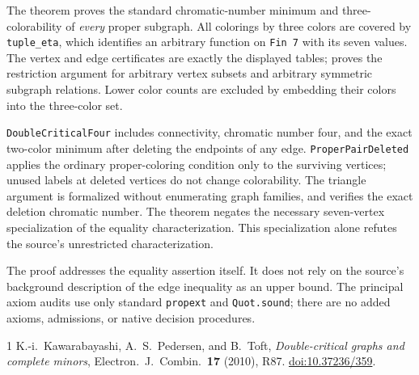 \documentclass[10pt]{article}
\begin{document}
The theorem  proves the standard chromatic-number
minimum and three-colorability of \emph{every} proper subgraph.
All colorings by three colors are covered by \texttt{tuple\_eta},
which identifies an arbitrary function on \texttt{Fin 7} with its seven
values. The vertex and edge certificates are exactly the displayed tables;
 proves the restriction argument for arbitrary
vertex subsets and arbitrary symmetric subgraph relations.
Lower color counts are excluded by embedding their colors into the three-color set.

\texttt{DoubleCriticalFour} includes connectivity, chromatic number four,
and the exact two-color minimum after deleting the endpoints of any edge.
\texttt{ProperPairDeleted} applies the ordinary proper-coloring condition
only to the surviving vertices; unused labels at deleted vertices do not
change colorability. The triangle argument is formalized without
enumerating graph families, and  verifies
the exact deletion chromatic number.
The theorem  negates the necessary
seven-vertex specialization of the equality characterization.
This specialization alone refutes the source's unrestricted characterization.

The proof addresses the equality assertion itself. It does not rely on the
source's background description of the edge inequality as an upper bound.
The principal axiom audits use only standard \texttt{propext} and
\texttt{Quot.sound}; there are no added axioms, admissions, or native
decision procedures.

\begin{thebibliography}{1}
K.-i.~Kawarabayashi, A.~S.~Pedersen, and B.~Toft,
\emph{Double-critical graphs and complete minors},
Electron.\ J.\ Combin.\ \textbf{17} (2010), R87.
\href{https://www.combinatorics.org/ojs/index.php/eljc/article/view/v17i1r87}{doi:10.37236/359}.
\end{thebibliography}
\end{document}
